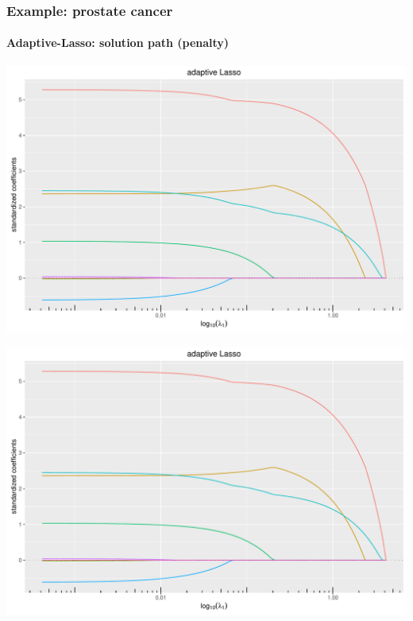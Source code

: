 \documentclass{beamer}\usepackage[]{graphicx}\usepackage[]{color}
\newenvironment{knitrout}{}{} %
\begin{document}
\begin{frame}[containsverbatim]
\frametitle{Example: prostate cancer}
\framesubtitle{Adaptive-Lasso: solution path (penalty)}

\begin{knitrout}\scriptsize
{}\color{fgcolor}
\includegraphics[width=\textwidth]{figures/varLasso-unnamed-chunk-83-1} 

\includegraphics[width=\textwidth]{figures/varLasso-unnamed-chunk-83-2} 

\end{knitrout}
\end{frame}
\end{document}

